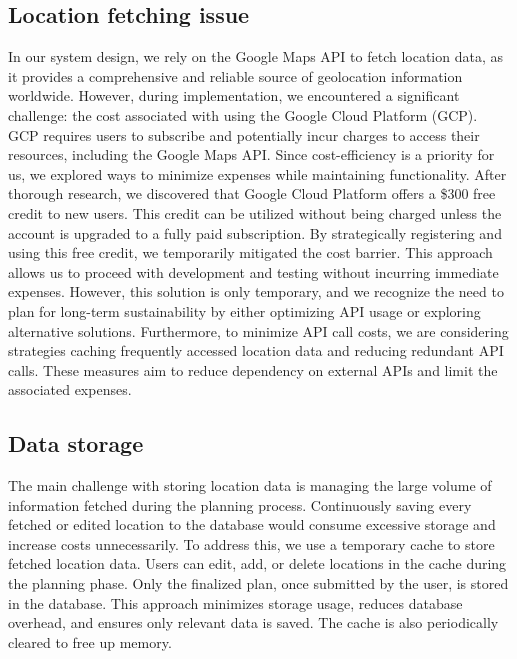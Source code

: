 \subsection{Location fetching issue}
In our system design, we rely on the Google Maps API to fetch location data, as it provides a
comprehensive and reliable source of geolocation information worldwide. However, during
implementation, we encountered a significant challenge: the cost associated with using the
Google Cloud Platform (GCP). GCP requires users to subscribe and potentially incur charges to
access their resources, including the Google Maps API. Since cost-efficiency is a priority for us,
we explored ways to minimize expenses while maintaining functionality. After thorough
research, we discovered that Google Cloud Platform offers a \$300 free credit to new users. This
credit can be utilized without being charged unless the account is upgraded to a fully paid
subscription. By strategically registering and using this free credit, we temporarily mitigated the
cost barrier. This approach allows us to proceed with development and testing without incurring
immediate expenses. However, this solution is only temporary, and we recognize the need to plan
for long-term sustainability by either optimizing API usage or exploring alternative solutions.
Furthermore, to minimize API call costs, we are considering strategies caching frequently
accessed location data and reducing redundant API calls. These measures aim to reduce
dependency on external APIs and limit the associated expenses.

\subsection{Data storage}
The main challenge with storing location data is managing the large volume of information
fetched during the planning process. Continuously saving every fetched or edited location to the
database would consume excessive storage and increase costs unnecessarily. To address this, we
use a temporary cache to store fetched location data. Users can edit, add, or delete locations in
the cache during the planning phase. Only the finalized plan, once submitted by the user, is
stored in the database. This approach minimizes storage usage, reduces database overhead, and
ensures only relevant data is saved. The cache is also periodically cleared to free up memory.

\newpage
